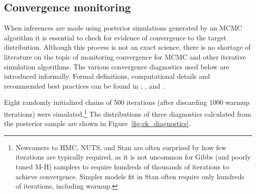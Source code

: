 \subsection{Convergence monitoring}
\label{subsection_convergence}



When inferences are made using posterior simulations generated by an MCMC algorithm it is essential to check for evidence of convergence to the target distribution. Although this process is not an exact science, there is no shortage of literature on the topic of monitoring convergence for MCMC and other iterative simulation algorithms. The various convergence diagnostics used below are introduced informally. Formal definitions, computational details and recommended best practices can be found in , , and .

Eight randomly initialized chains of 500 iterations (after discarding 1000 warmup iterations) were simulated.\footnote{Newcomers to HMC, NUTS, and Stan are often surprised by how few iterations are typically required, as it is not uncommon for Gibbs (and poorly tuned M-H) samplers to require hundreds of thousands of iterations to achieve convergence. Simpler models fit in Stan often require only hundreds of iterations, including warmup.} The distributions of three diagnostics calculated from the posterior sample are shown in Figure~\ref{fig:ck_diagnostics}. 

